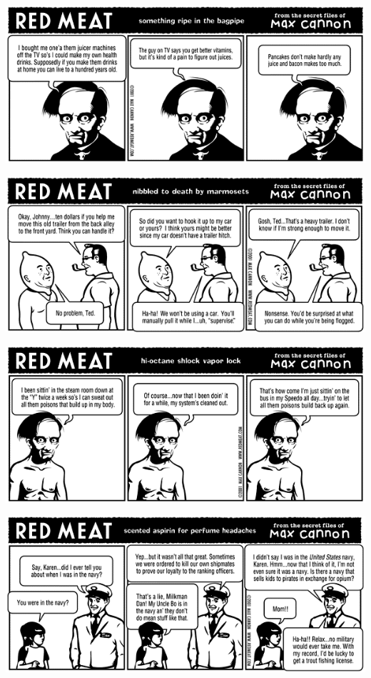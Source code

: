 \documentclass[a4paper,twoside,11pt]{article}
\begin{document}
\includegraphics[width=\textwidth]{redmeat_2001-02-20.png}



\includegraphics[width=\textwidth]{redmeat_2001-02-27.png}



\includegraphics[width=\textwidth]{redmeat_2001-03-06.png}



\includegraphics[width=\textwidth]{redmeat_2001-03-13.png}
\end{document}
